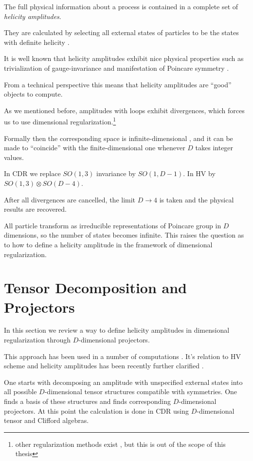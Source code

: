 The full physical information about a process is contained in a complete set of \textit{helicity amplitudes}.

They are calculated by selecting all external states of particles to be the states with definite helicity .

It is well known that helicity amplitudes exhibit nice physical properties such as trivialization of gauge-invariance and
manifestation of Poincare symmetry .

From a technical perspective this means that helicity amplitudes are ``good'' objects to compute. 

As we mentioned before, amplitudes with loops exhibit divergences, which forces us
to use dimensional regularization.\footnote{other regularization methods exist , but this is out of the scope of this thesis}


Formally then the corresponding space is infinite-dimensional , and
it can be made to ``coincide'' with the finite-dimensional one whenever $D$ takes integer values.

In CDR we replace $SO(1,3)$ invariance by $SO(1,D-1)$.
In HV by $SO(1,3)\otimes SO(D-4)$.

After all divergences are cancelled, the limit $D\to4$ is taken and the physical results are recovered.

All particle transform as irreducible representations of Poincare group in $D$ dimensions,
so the number of states becomes infinite.
This raises the question as to how to define a helicity amplitude in the framework of dimensional regularization.


\section{Tensor Decomposition and Projectors}

In this section we review a way to define helicity amplitudes in dimensional regularization through
$D$-dimensional projectors.

This approach has been used in a number of computations \cite{Garland:2002ak, Moch:2002hm, Glover:2003cm, Glover:2004si,Gehrmann:2009vu,Gehrmann:2011aa}.
It's relation to HV scheme and helicity amplitudes has been recently further clarified \cite{Peraro:2019cjj}.

One starts with decomposing an amplitude with unspecified external states into all possible $D$-dimensional tensor structures compatible
with symmetries. One finds a basis of these structures and finds corresponding $D$-dimensional projectors.
At this point the calculation is done in CDR using $D$-dimensional tensor and Clifford algebras.


